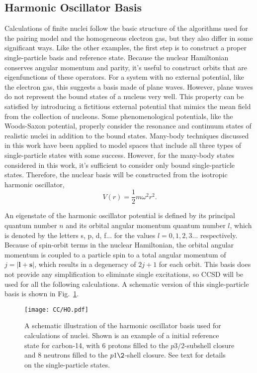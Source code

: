 \documentclass[thesis.tex]{subfiles}
\begin{document}
\subsection{Harmonic Oscillator Basis} \label{section:ho_basis}
Calculations of finite nuclei follow the basic structure of the algorithms used for the pairing model and the homogeneous electron gas, but they also differ in some significant ways.  Like the other examples, the first step is to construct a proper single-particle basis and reference state.  Because the nuclear Hamiltonian conserves angular momentum and parity, it's useful to construct orbits that are eigenfunctions of these operators.  For a system with no external potential, like the electron gas, this suggests a basis made of plane waves.  However, plane waves do not represent the bound states of a nucleus very well.  This property can be satisfied by introducing a fictitious external potential that mimics the mean field from the collection of nucleons.  Some phenomenological potentials, like the Woods-Saxon potential, properly consider the resonance and continuum states of realistic nuclei in addition to the bound states.  Many-body techniques discussed in this work have been applied to model spaces that include all three types of single-particle states \cite{MICHEL2006,HAGEN2007169} with some success.  However, for the many-body states considered in this work, it's sufficient to consider only bound single-particle states.  Therefore, the nuclear basis will be constructed from the isotropic harmonic oscillator,
\begin{equation}
  V\left(r\right) = \frac{1}{2}m\omega^{2}r^{2}.
\end{equation}

An eigenstate of the harmonic oscillator potential is defined by its principal quantum number $n$ and its orbital angular momentum quantum number $l$, which is denoted by the letters s, p, d, f... for the values $l=0,1,2,3...$ respectively.  Because of spin-orbit terms in the nuclear Hamiltonian, the orbital angular momentum is coupled to a particle spin to a total angular momentum of $j = \lvert \mathbf{l} + \mathbf{s} \rvert$, which results in a degeneracy of $2j + 1$ for each orbit.  This basis does not provide any simplification to eliminate single excitations, so CCSD will be used for all the following calculations.  A schematic version of this single-particle basis is shown in Fig.\ \ref{fig:Harmonic_Oscillator}.
\begin{figure}[h]
  \centering
  \texttt{[image: CC/HO.pdf]}
  \caption{A schematic illustration of the harmonic oscillator basis used for calculations of nuclei. Shown is an example of a initial reference state for carbon-14, with 6 protons filled to the $p3/2$-subshell closure and 8 neutrons filled to the $p1\2$-shell closure.  See text for details on the single-particle states.}
  \label{fig:Harmonic_Oscillator}
\end{figure}
\end{document}
